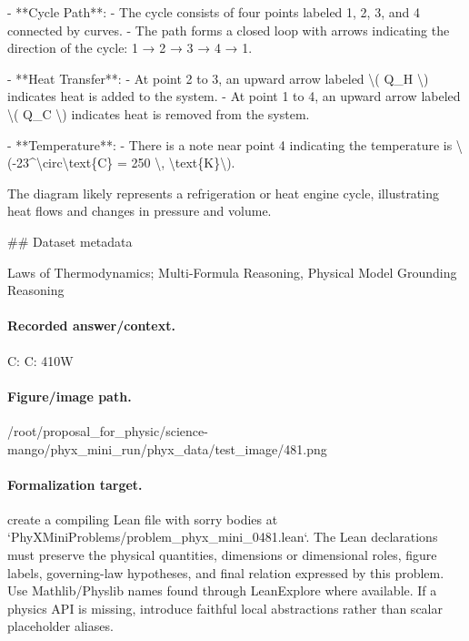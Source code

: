 - **Cycle Path**:
  - The cycle consists of four points labeled 1, 2, 3, and 4 connected by curves.
  - The path forms a closed loop with arrows indicating the direction of the cycle: 1 → 2 → 3 → 4 → 1.

- **Heat Transfer**:
  - At point 2 to 3, an upward arrow labeled \textbackslash{}( Q\_H \textbackslash{}) indicates heat is added to the system.
  - At point 1 to 4, an upward arrow labeled \textbackslash{}( Q\_C \textbackslash{}) indicates heat is removed from the system.

- **Temperature**:
  - There is a note near point 4 indicating the temperature is \textbackslash{}(-23\textasciicircum{}\textbackslash{}circ\textbackslash{}text\{C\} = 250 \textbackslash{}, \textbackslash{}text\{K\}\textbackslash{}).

The diagram likely represents a refrigeration or heat engine cycle, illustrating heat flows and changes in pressure and volume.

\#\# Dataset metadata

Laws of Thermodynamics; Multi-Formula Reasoning, Physical Model Grounding Reasoning

\paragraph{Recorded answer/context.}
C: C: 410W

\paragraph{Figure/image path.}
/root/proposal\_for\_physic/science-mango/phyx\_mini\_run/phyx\_data/test\_image/481.png

\paragraph{Formalization target.}
create a compiling Lean file with sorry bodies at `PhyXMiniProblems/problem\_phyx\_mini\_0481.lean`. The Lean declarations must preserve the physical quantities, dimensions or dimensional roles, figure labels, governing-law hypotheses, and final relation expressed by this problem.
Use Mathlib/Physlib names found through LeanExplore where available. If a physics API is missing, introduce faithful local abstractions rather than scalar placeholder aliases.

